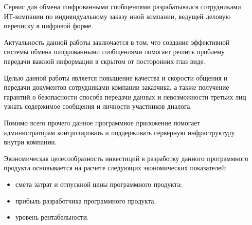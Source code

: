 Сервис для обмена шифрованными сообщениями разрабатывался сотрудниками ИТ-компании по индивидуальному заказу иной компании, ведущей деловую переписку в цифровой форме.

Актуальность данной работы заключается в том, что создание эффективной системы обмена шифрованными сообщениями помогает решить проблему передачи важной информации в скрытом от посторонних глаз виде.

Целью данной работы является повышение качества и скорости общения и передачи документов сотрудниками компании заказчика, а также получение гарантий о безопасности способа передачи данных и невозможности третьих лиц узнать содержимое сообщения и личности участников диалога.

Помимо всего прочего данное программное приложение помогает администраторам контролировать и поддерживать серверную инфраструктуру внутри компании.

Экономическая целесообразность инвестиций в разработку данного программного продукта основывается на расчете следующих экономических показателей:
\begin{itemize}
    \item смета затрат и отпускной цены программного продукта;
    \item прибыль разработчика программного продукта;
    \item уровень рентабельности.
\end{itemize}